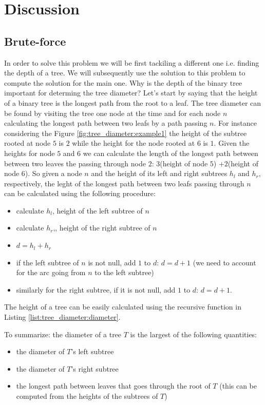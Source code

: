\section{Discussion}
\label{tree_diameter:sec:discussion}


\subsection{Brute-force}
\label{tree_diameter:sec:bruteforce}

In order to  solve this problem we will be first tackiling a different one i.e. finding the depth of a tree. We will subsequently use the solution to this problem to compute the solution for the main one. 
Why is the depth of the binary tree important for determing the tree diameter? Let's start by saying that the height of a binary tree is the longest path from the root to a leaf. The tree diameter can be found by visiting the tree one node at the time and for each node $n$ calculating the longest path between two leafs by a path passing $n$. For instance considering the Figure \ref{fig:tree_diameter:example1} the height of the subtree rooted at node $5$ is $2$ while the height for the node rooted at $6$ is $1$. Given the heights for node $5$ and $6$ we can calculate the length of the longest path between between two  leaves the passing through node $2$: $3$(height of node $5$) $+2$(height of node $6$). So given a node $n$ and the height of its left and right subtrees $h_l$ and $h_r$, respectively, the leght of the longest path between two leafs passing through $n$ can be calculated using the following procedure:

\begin{itemize}
	\item calculate $h_l$, height of the left subtree  of $n$
	\item calculate $h_r$,, height of the right subtree  of $n$
	\item $d=h_l+h_r$
	\item if the left subtree of $n$ is not null, add $1$ to $d$: $d=d+1$ (we need to account for the arc going from $n$ to the left subtree)
	\item similarly for the right subtree, if it is not null, add $1$ to $d$: $d=d+1$.
\end{itemize}

The height of a tree can be easily calculated using the recursive function  in Listing \ref{list:tree_diameter:diameter}.

To summarize:  the diameter of a tree $T$ is the largest of the following quantities:
\begin{itemize}
    \item the diameter of $T$'s left subtree
    \item the diameter of $T$'s right subtree
    \item the longest path between leaves that goes through the root of $T$ (this can be computed from the heights of the subtrees of $T$) 
\end{itemize}

